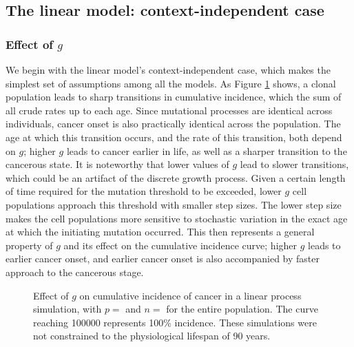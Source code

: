 \documentclass[12pt, onecolumn]{article}
\begin{document}
	\subsection{The linear model: context-independent case}
	
	\subsubsection{Effect of $g$}
	We begin with the linear model's context-independent case, which makes the simplest set of assumptions among all the models. As Figure \ref{fig1} shows, a clonal population leads to sharp transitions in cumulative incidence, which the sum of all crude rates up to each age. Since mutational processes are identical across individuals, cancer onset is also practically identical across the population. The age at which this transition occurs, and the rate of this transition, both depend on $g$; higher $g$ leads to cancer earlier in life, as well as a sharper transition to the cancerous state. It is noteworthy that lower values of $g$ lead to slower transitions, which could be an artifact of the discrete growth process. Given a certain length of time required for the mutation threshold to be exceeded, lower $g$ cell populations approach this threshold with smaller step sizes. The lower step size makes the cell populations more sensitive to stochastic variation in the exact age at which the initiating mutation occurred. This then represents a general property of $g$ and its effect on the cumulative incidence curve; higher $g$ leads to earlier cancer onset, and earlier cancer onset is also accompanied by faster approach to the cancerous stage.
	
	\begin{figure}
		\centering
		\def\svgscale{0.25}
		\def\svgwidth{0.5\columnwidth}
		
		\caption{\label{fig1} Effect of $g$ on cumulative incidence of cancer in a linear process simulation, with $p=$ and $n=$ for the entire population. The curve reaching 100000 represents 100\% incidence. These simulations were not constrained to the physiological lifespan of 90 years.}
	\end{figure}
\end{document}
